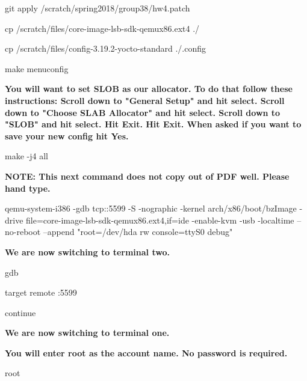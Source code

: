 \documentclass[journal,10pt,onecolumn,letterpaper,draftclsnofoot]{IEEEtran}
\begin{document}
git apply /scratch/spring2018/group38/hw4.patch\newline

cp /scratch/files/core-image-lsb-sdk-qemux86.ext4 ./\newline

cp /scratch/files/config-3.19.2-yocto-standard ./.config\newline

make menuconfig\newline

\textbf{You will want to set SLOB as our allocator. To do that follow these instructions:\newline
Scroll down to "General Setup" and hit select.\newline
Scroll down to "Choose SLAB Allocator" and hit select.\newline
Scroll down to "SLOB" and hit select.\newline
Hit Exit.\newline
Hit Exit.\newline
When asked if you want to save your new config hit Yes.\newline
}

make -j4 all\newline

\textbf{NOTE: This next command does not copy out of PDF well. Please hand type.\newline}

qemu-system-i386 -gdb tcp::5599 -S -nographic -kernel arch/x86/boot/bzImage -drive file=core-image-lsb-sdk-qemux86.ext4,if=ide -enable-kvm -usb -localtime --no-reboot --append "root=/dev/hda rw console=ttyS0 debug"\newline

\textbf{We are now switching to terminal two.\newline}

gdb\newline

target remote :5599\newline

continue\newline

\textbf{We are now switching to terminal one.\newline}

\textbf{You will enter root as the account name. No password is required.\newline}

root\newline
\end{document}

